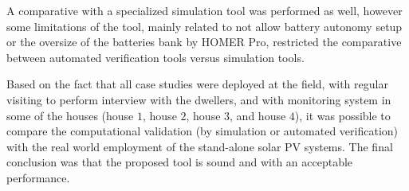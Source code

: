 A comparative with a specialized simulation tool was performed as well, however some limitations of the tool, mainly related to not allow battery autonomy setup or the oversize of the batteries bank by HOMER Pro, restricted the comparative between automated verification tools versus simulation tools.

Based on the fact that all case studies were deployed at the field, with regular visiting to perform interview with the dwellers, and with monitoring system in some of the houses (house $1$, house $2$, house $3$, and house $4$), it was possible to compare the computational validation (by simulation or automated verification) with the real world employment of the stand-alone solar PV systems. The final conclusion was that the proposed tool is sound and with an acceptable performance. 